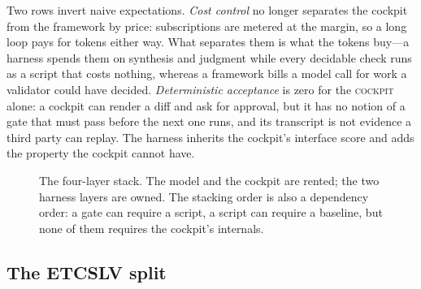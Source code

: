 \documentclass[10pt,a4paper]{article}
\theoremstyle{definition}
\theoremstyle{plain}
\theoremstyle{principle}
\newcommand{\ck}{\textsc{cockpit}}
\begin{document}
Two rows invert naive expectations. \emph{Cost control} no longer separates the cockpit from the
framework by price: subscriptions are metered at the margin, so a long loop pays for tokens either
way. What separates them is what the tokens buy---a harness spends them on synthesis and judgment
while every decidable check runs as a script that costs nothing, whereas a framework bills a model
call for work a validator could have decided. \emph{Deterministic acceptance} is zero for the \ck{}
alone: a cockpit can render a diff and ask for approval, but it has no notion of a gate that must
pass before the next one runs, and its transcript is not evidence a third party can replay. The
harness inherits the cockpit's interface score and adds the property the cockpit cannot have.

\begin{figure}[htbp]
\centering
{}
\caption{The four-layer stack. The model and the cockpit are rented; the two harness layers are
owned. The stacking order is also a dependency order: a gate can require a script, a script can
require a baseline, but none of them requires the cockpit's internals.}
\label{fig:layers}
\end{figure}

\subsection{The ETCSLV split}\label{sec:etcslv}
\end{document}
